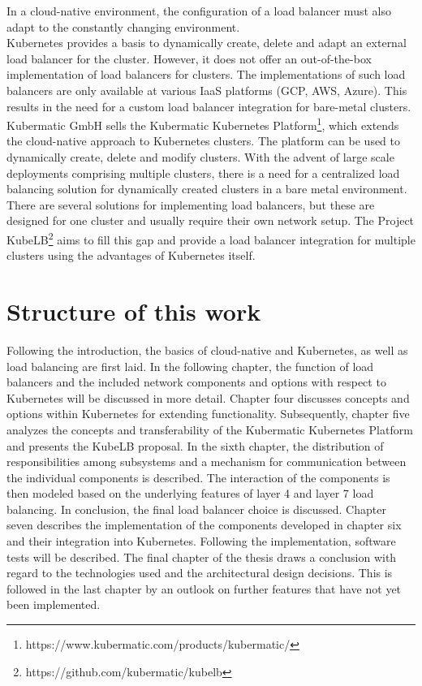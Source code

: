 In a cloud-native environment, the configuration of a load balancer must also adapt to the constantly changing environment.
\\
Kubernetes provides a basis to dynamically create, delete and adapt an external load balancer for the cluster.
However, it does not offer an out-of-the-box implementation of load balancers for clusters.
The implementations of such load balancers are only available at various IaaS platforms (GCP, AWS, Azure).
This results in the need for a custom load balancer integration for bare-metal clusters.
\\
Kubermatic GmbH sells the Kubermatic Kubernetes Platform\footnote{https://www.kubermatic.com/products/kubermatic/}, which extends the cloud-native approach to Kubernetes clusters.
The platform can be used to dynamically create, delete and modify clusters.
With the advent of large scale deployments comprising multiple clusters, there is a need for a centralized load balancing solution for dynamically created clusters in a bare metal environment.
There are several solutions for implementing load balancers, but these are designed for one cluster and usually require their own network setup.
The Project KubeLB\footnote{https://github.com/kubermatic/kubelb} aims to fill this gap and provide a load balancer integration for multiple clusters using the advantages of Kubernetes itself.

\section{Structure of this work}
Following the introduction, the basics of cloud-native and Kubernetes, as well as load balancing are first laid.
In the following chapter, the function of load balancers and the included network components and options with respect to Kubernetes will be discussed in more detail.
Chapter four discusses concepts and options within Kubernetes for extending functionality.
Subsequently, chapter five analyzes the concepts and transferability of the Kubermatic Kubernetes Platform and presents the KubeLB proposal.
In the sixth chapter, the distribution of responsibilities among subsystems and a mechanism for communication between the individual components is described.
The interaction of the components is then modeled based on the underlying features of layer 4 and layer 7 load balancing.
In conclusion, the final load balancer choice is discussed.
Chapter seven describes the implementation of the components developed in chapter six and their integration into Kubernetes.
Following the implementation, software tests will be described.
The final chapter of the thesis draws a conclusion with regard to the technologies used and the architectural design decisions.
This is followed in the last chapter by an outlook on further features that have not yet been implemented.

